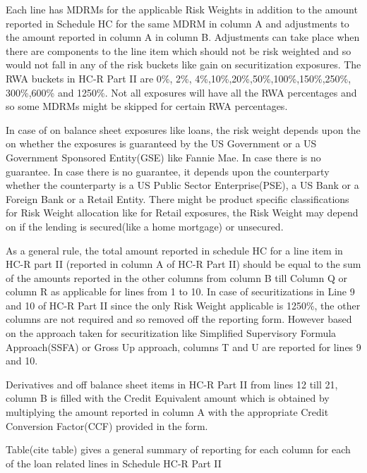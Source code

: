 \documentclass[conference]{IEEEtran}
\begin{document}
    
    Each line has MDRMs for the applicable Risk Weights in addition to the amount reported in Schedule HC for the same MDRM in column A and adjustments to the amount reported in column A in column B. Adjustments can take place when there are components to the line item which should not be risk weighted and so would not fall in any of the risk buckets like gain on securitization exposures. The RWA buckets in HC-R Part II are 0\%, 2\%, 4\%,10\%,20\%,50\%,100\%,150\%,250\%, 300\%,600\% and 1250\%. Not all exposures will have all the RWA percentages and so some MDRMs might be skipped for certain RWA percentages.
    
      In case of on balance sheet exposures like loans, the risk weight depends upon the on whether the exposures is guaranteed by the US Government or a US Government Sponsored Entity(GSE) like Fannie Mae. In case there is no guarantee. In case there is no guarantee, it depends upon the counterparty whether the counterparty is a US Public Sector Enterprise(PSE), a US Bank or a Foreign Bank or a Retail Entity. There might be product specific classifications for Risk Weight allocation like for Retail exposures, the Risk Weight may depend on if the lending is secured(like a home mortgage) or unsecured. \cite{PolkB3}
      
      As a general rule, the total amount reported in schedule HC for a line item in HC-R part II (reported in column A of HC-R Part II) should be equal to the sum of the amounts reported in the other columns from column B till Column Q or column R as applicable for lines from 1 to 10. In case of securitizations in Line 9 and 10 of HC-R Part II since the only Risk Weight applicable is 1250\%, the other columns are not required and so removed off the reporting form. However based on the approach taken for securitization like Simplified Supervisory Formula Approach(SSFA) or Gross Up approach, columns T and U are reported for lines 9 and 10.
      
      Derivatives and off balance sheet items in HC-R Part II from lines 12 till 21, column B is filled with the Credit Equivalent amount which is obtained by multiplying the amount reported in column A with the appropriate Credit Conversion Factor(CCF) provided in the form. 
      
      Table(cite table) gives a general summary of reporting for each column for each of the loan related lines in Schedule HC-R Part II
	
\end{document}
